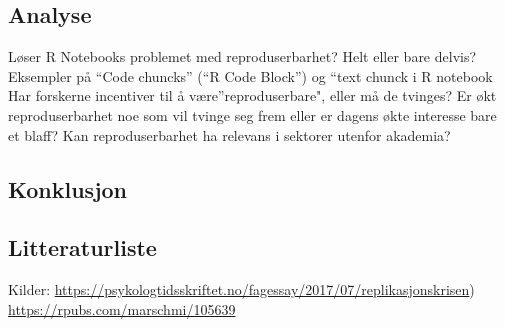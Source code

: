 \documentclass[
]{article}
\begin{document}
\hypertarget{analyse}{%
\subsection{Analyse}\label{analyse}}

Løser R Notebooks problemet med reproduserbarhet? Helt eller bare
delvis? Eksempler på ``Code chuncks'' (``R Code Block'') og ``text
chunck i R notebook Har forskerne incentiver til å
være''reproduserbare", eller må de tvinges? Er økt reproduserbarhet noe
som vil tvinge seg frem eller er dagens økte interesse bare et blaff?
Kan reproduserbarhet ha relevans i sektorer utenfor akademia?

\hypertarget{konklusjon}{%
\subsection{Konklusjon}\label{konklusjon}}

\hypertarget{litteraturliste}{%
\subsection{Litteraturliste}\label{litteraturliste}}

Kilder:
\url{https://psykologtidsskriftet.no/fagessay/2017/07/replikasjonskrisen})
\url{https://rpubs.com/marschmi/105639}
\end{document}
